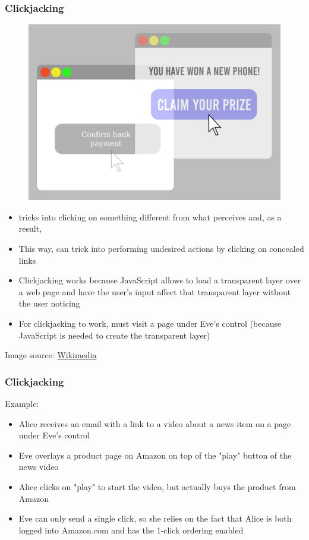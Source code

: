 \begin{frame}
    \frametitle{Clickjacking}
    \begin{figure}
        \centering
        \includegraphics[scale=.3]{img/clickjacking.png}
    \end{figure}
    \begin{itemize}
        \item \eve tricks \alice into clicking on something different from what \alice perceives and, as a result, 
        \item This way, \eve can trick \alice into performing undesired actions by clicking on concealed links
        \item Clickjacking works because JavaScript allows to load a transparent layer over a web page and have the user's input affect that transparent layer without the user noticing
        \item For clickjacking to work, \alice must visit a page under Eve's control (because JavaScript is needed to create the transparent layer)
    \end{itemize}
    Image source: \href{https://upload.wikimedia.org/wikipedia/commons/thumb/0/0f/Clickjacking.png/1024px-Clickjacking.png}{Wikimedia}
\end{frame}

\begin{frame}
    \frametitle{Clickjacking}
    Example:
    \begin{itemize}
        \item Alice receives an email with a link to a video about a news item on a page under Eve's control
        \item Eve overlays a product page on Amazon on top of the "play" button of the news video
        \item Alice clicks on "play" to start the video, but actually buys the product from Amazon
        \item Eve can only send a single click, so she relies on the fact that Alice is both logged into Amazon.com and has the 1-click ordering enabled 
    \end{itemize}
\end{frame}

